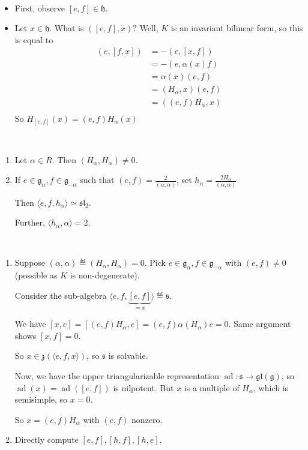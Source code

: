 \documentclass[x11names,reqno,14pt]{extarticle}
\newcommand{\mk}[1]{\mathfrak{#1}}
\newcommand{\g}{\mk{g}}
\newcommand{\h}{\mk{h}}
\DeclareMathOperator{\ad}{ad}
\newcommand{\gl}{\mk{g}\mk{l}}
\renewcommand{\sl}{\mk{s}\mk{l}}
\begin{document}
\proof
\,
\begin{itemize}

\item First, observe $[e,f] \in \h$. 

\item Let $x \in \h$. What is $([e,f],x)?$ Well, $K$ is an invariant bilinear form, so this is equal to 
\begin{align*}
(e,[f,x]) & = -(e,[x,f]) \\
& = - (e,\alpha(x)f) \\
& = \alpha(x)(e,f) \\
& = (H_\alpha,x)(e,f) \\
& = ((e,f)H_\alpha,x) \\
\end{align*}
So $H_{[e,f]}(x) = (e,f)H_\alpha(x)$

\end{itemize}

\lem
\,
\begin{enumerate}

\item Let $\alpha \in R$. Then $(H_\alpha,H_\alpha) \neq 0$. 

\item If $e \in \g_\alpha, f \in \g_{-\alpha}$ such that $(e,f) = \frac{2}{(\alpha,\alpha)}$, set $h_\alpha = \frac{2H_\alpha}{(\alpha,\alpha)}$

Then $\langle e, f, h_\alpha \rangle \simeq \sl_2$. 

Further, $\langle h_\alpha,\alpha \rangle = 2$. 

\end{enumerate}

\proof
\,
\begin{enumerate}

\item Suppose $(\alpha,\alpha)\eqdef (H_\alpha,H_\alpha) = 0$. Pick $e \in \g_\alpha, f \in \g_{-\alpha}$ with $(e,f)\neq0$ (possible as $K$ is non-degenerate). 

Consider the sub-algebra $\langle e, f, \underbrace{[e, f]}_{=x}\rangle \eqdef \mk{s}$. 

We have $[x,e] = [(e,f)H_\alpha,e] = (e,f)\alpha(H_\alpha)e = 0$. Same argument shows $[x,f] = 0$. 

So $x \in \mk{z}(\langle e, f, x\rangle)$, so $\mk{s}$ is solvable. 

Now, we have the upper triangularizable representation $\ad:\mk{s}\to\gl(\g)$, so $\ad(x) = \ad([e,f])$ is nilpotent. But $x$ is a multiple of $H_\alpha$, which is semisimple, so $x = 0$. 

So $x = (e,f)H_\alpha$ with $(e,f)$ nonzero. 

\item Directly compute $[e,f],[h,f],[h,e]$. 

\end{enumerate}
\end{document}
